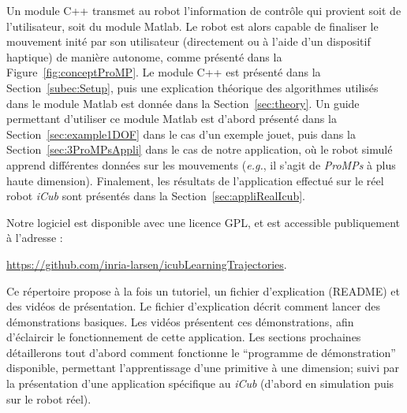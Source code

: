 \documentclass[utf8]{frontiersSCNS} %
\newcommand{\todo}[1]{\textcolor{red}{\textbf{/*#1*/}}}
\begin{document}
Un module C++ transmet au robot l'information de contrôle qui provient soit de l'utilisateur, soit du module Matlab. Le robot est alors capable de finaliser le mouvement inité par son utilisateur (directement ou à l'aide d'un dispositif haptique) de manière autonome, comme présenté dans la Figure~\ref{fig:conceptProMP}. %
Le module C++ est présenté dans la Section~\ref{subec:Setup}, puis une explication théorique des algorithmes utilisés dans le module Matlab  est donnée dans la Section~\ref{sec:theory}. Un guide permettant d'utiliser ce module Matlab est d'abord présenté dans  la Section~\ref{sec:example1DOF} dans le cas d'un exemple jouet, puis dans la Section~\ref{sec:3ProMPsAppli} dans le cas de notre application, où le robot simulé apprend différentes données sur les mouvements (\textit{e.g.}, il s'agit de \textit{ProMPs} à plus haute dimension). Finalement, les résultats de l'application effectué sur le réel robot \textit{iCub} sont présentés dans la Section~\ref{sec:appliRealIcub}.

Notre logiciel est disponible avec une licence GPL, et est accessible publiquement à l'adresse : 

\url{https://github.com/inria-larsen/icubLearningTrajectories}.

Ce répertoire propose à la fois un tutoriel, un fichier d'explication (README) et des vidéos de présentation.
Le fichier d'explication décrit comment lancer des démonstrations basiques. Les vidéos présentent ces démonstrations, afin d'éclaircir le fonctionnement de cette application. Les sections prochaines détaillerons tout d'abord comment fonctionne le ``programme de démonstration'' disponible, permettant l'apprentissage d'une primitive à une dimension; suivi par la présentation d'une application spécifique au \textit{iCub} (d'abord en simulation puis sur le robot réel).


\end{document}
